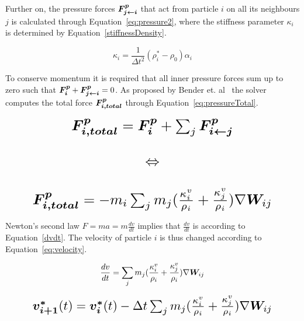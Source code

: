     Further on, the pressure forces $\bm{F_{j\leftarrow i}^p} $ that act from particle $i$ on all its neighbours $j$ is calculated through Equation~\ref{eq:pressure2}, where the stiffness parameter $\kappa_i$ is determined by Equation~\ref{stiffnessDensity}.

    \begin{equation} \label{stiffnessDensity}
    \kappa_i = \frac{1}{\Delta t^2}(\rho_i^*-\rho_0)\alpha_i
    \end{equation}

    To conserve momentum it is required that all inner pressure forces sum up to zero such that $\bm{F_i^p} + \bm{F_{j\leftarrow i}^p} = 0$.
    As proposed by Bender et. al~\cite{bender} the solver computes the total force $\bm{F_{i,total}^p}$ through Equation~\ref{eq:pressureTotal}.

    \begin{equation} \label{eq:pressureTotal}
        \resizebox{0.85\linewidth}{!}{$
        \begin{matrix}
            \vect{F_{i,total}^p} = \vect{F_i^p} + \sum_j \vect{F_{i\leftarrow j}^p} \\
            \\
            \Leftrightarrow \\ 
            \\
            \vect{F_{i,total}^p} = -m_i \sum_j m_j (\frac{\kappa_i^v}{\rho_i} + \frac{\kappa_j^v}{\rho_i}) \nabla \vect{W}_{ij}
        \end{matrix}
        $}
    \end{equation}

    Newton's second law $F = ma = m\frac{dv}{dt}$ implies that $\frac{dv}{dt}$ is according to Equation~\ref{dvdt}. 
    The velocity of particle $i$ is thus changed according to Equation~\ref{eq:velocity}.

    \begin{equation} \label{dvdt}
        \frac{dv}{dt} = \sum_j m_j (\frac{\kappa_i^v}{\rho_i} + \frac{\kappa_j^v}{\rho_i}) \nabla \bm{W}_{ij}
    \end{equation}


    \begin{equation} \label{eq:velocity}
        \resizebox{0.85\linewidth}{!}{$
        \vect{v_{i+1}^*}(t) = \vect{v_i^*}(t) - \Delta t \sum_j m_j (\frac{\kappa_i^v}{\rho_i} + \frac{\kappa_j^v}{\rho_i}) \nabla \vect{W}_{ij}
        $}
    \end{equation}




